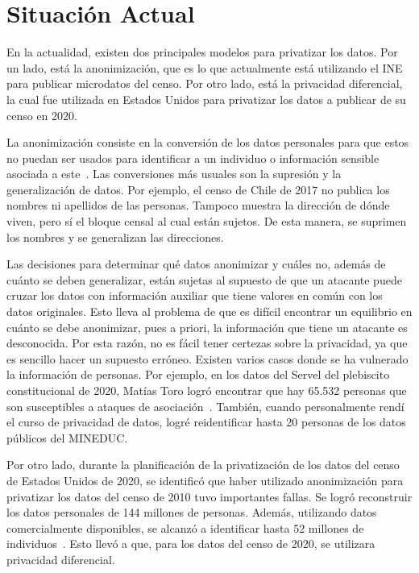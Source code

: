 \documentclass[informe]{upropuesta}
\begin{document}
\section{Situación Actual}\label{sec}

En la actualidad, existen dos principales modelos para privatizar los datos. Por un lado, está la anonimización, que es lo que actualmente está utilizando el INE para publicar microdatos del censo. Por otro lado, está la privacidad diferencial, la cual fue utilizada en Estados Unidos para privatizar los datos a publicar de su censo en 2020.

La anonimización consiste en la conversión de los datos personales para que estos no puedan ser usados para identificar a un individuo o información sensible asociada a este~\cite{anonimization}. Las conversiones más usuales son la supresión y la generalización de datos. Por ejemplo, el censo de Chile de 2017 no publica los nombres ni apellidos de las personas. Tampoco muestra la dirección de dónde viven, pero sí el bloque censal al cual están sujetos. De esta manera, se suprimen los nombres y se generalizan las direcciones.

Las decisiones para determinar qué datos anonimizar y cuáles no, además de cuánto se deben generalizar, están sujetas al supuesto de que un atacante puede cruzar los datos con información auxiliar que tiene valores en común con los datos originales. Esto lleva al problema de que es difícil encontrar un equilibrio en cuánto se debe anonimizar, pues a priori, la información que tiene un atacante es desconocida. Por esta razón, no es fácil tener certezas sobre la privacidad, ya que es sencillo hacer un supuesto erróneo. Existen varios casos donde se ha vulnerado la información de personas. Por ejemplo, en los datos del Servel del plebiscito constitucional de 2020, Matías Toro logró encontrar que hay 65.532 personas que son susceptibles a ataques de asociación~\cite{MToroServel}. También, cuando personalmente rendí el curso de privacidad de datos, logré reidentificar hasta 20 personas de los datos públicos del MINEDUC.

Por otro lado, durante la planificación de la privatización de los datos del censo de Estados Unidos de 2020, se identificó que haber utilizado anonimización para privatizar los datos del censo de 2010 tuvo importantes fallas. Se logró reconstruir los datos personales de 144 millones de personas. Además, utilizando datos comercialmente disponibles, se alcanzó a identificar hasta 52 millones de individuos~\cite{Garfinkel2022Differential}. Esto llevó a que, para los datos del censo de 2020, se utilizara privacidad diferencial.
\end{document}
